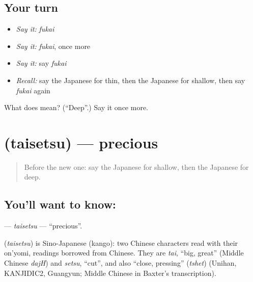 \subsection*{Your turn}
\begin{itemize}
\raggedright
  \item \emph{Say it:} \emph{fukai}
  \item \emph{Say it:} \emph{fukai}, once more
  \item \emph{Say it:} say \emph{fukai}
  \item \emph{Recall:} say the Japanese for thin, then the Japanese for shallow, then say \emph{fukai} again
\end{itemize}

\begin{tcolorbox}[breakable,colback=teal!4,colframe=teal!35!black,title={Before you move on}]
What does  mean? (\textquotedblleft{}Deep\textquotedblright{}.) Say it once more.
\end{tcolorbox}
\section[\texorpdfstring{\ja{たいせつ} (taisetsu)}{たいせつ (taisetsu)}]{ (taisetsu) — precious}

\label{lesson:JA-C122-taisetsu}



\begin{quote}
Before the new one: say the Japanese for shallow, then the Japanese for deep.
\end{quote}

\subsection*{You'll want to know: }
\textbf{} — \emph{taisetsu} — \textquotedblleft{}precious\textquotedblright{}.

\begin{cousinweb}
\textbf{} (\emph{taisetsu}) is Sino-Japanese (kango): two Chinese characters read with their on'yomi, readings borrowed from Chinese. They are \emph{tai}, \textquotedblleft{}big, great\textquotedblright{} (Middle Chinese \emph{dajH}) and \emph{setsu}, \textquotedblleft{}cut\textquotedblright{}, and also \textquotedblleft{}close, pressing\textquotedblright{} (\emph{tshet}) (Unihan, KANJIDIC2, Guangyun; Middle Chinese in Baxter's transcription).
\end{cousinweb}

